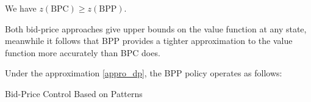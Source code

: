 \begin{prop}\label{BPC_relation}
    We have $z(\text{BPC}) \geq z(\text{BPP})$.
\end{prop}
    

    
Both bid-price approaches give upper bounds on the value function at any state, meanwhile it follows that BPP provides a tighter approximation to the value function more accurately than BPC does.

Under the approximation \eqref{appro_dp}, the BPP policy operates as follows:



\begin{algorithm}[H]
    \caption{Bid-Price Control Based on Patterns}\label{algo_improve_bid}
\end{algorithm}



